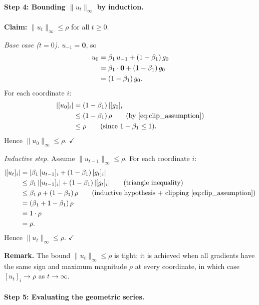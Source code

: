 \documentclass{article}
\begin{document}
\paragraph{Step 4: Bounding $\|u_t\|_\infty$ by induction.}

\noindent\textbf{Claim:} $\|u_t\|_\infty \leq \rho$ for all $t \geq 0$.

\emph{Base case ($t = 0$).}
$u_{-1} = \mathbf{0}$, so
\begin{align}
u_0
&= \beta_1\,u_{-1} + (1-\beta_1)\,g_0 \notag \\
&= \beta_1 \cdot \mathbf{0} + (1-\beta_1)\,g_0 \notag \\
&= (1-\beta_1)\,g_0.
\label{eq:drift_u0}
\end{align}
For each coordinate $i$:
\begin{align}
|[u_0]_i|
&= (1-\beta_1)\,|[g_0]_i| \notag \\
&\leq (1-\beta_1)\,\rho
\qquad\text{(by~\eqref{eq:clip_assumption})} \notag \\
&\leq \rho
\qquad\text{(since $1 - \beta_1 \leq 1$)}.
\label{eq:drift_u0_bound}
\end{align}
Hence $\|u_0\|_\infty \leq \rho$. $\checkmark$

\emph{Inductive step.}
Assume $\|u_{t-1}\|_\infty \leq \rho$. For each coordinate $i$:
\begin{align}
|[u_t]_i|
&= |\beta_1\,[u_{t-1}]_i + (1-\beta_1)\,[g_t]_i|
\notag \\
&\leq \beta_1\,|[u_{t-1}]_i| + (1-\beta_1)\,|[g_t]_i|
\qquad\text{(triangle inequality)}
\notag \\
&\leq \beta_1\,\rho + (1-\beta_1)\,\rho
\qquad\text{(inductive hypothesis $+$ clipping~\eqref{eq:clip_assumption})}
\notag \\
&= (\beta_1 + 1 - \beta_1)\,\rho
\notag \\
&= 1 \cdot \rho
\notag \\
&= \rho.
\label{eq:drift_u_induction}
\end{align}
Hence $\|u_t\|_\infty \leq \rho$. $\checkmark$

\noindent\textbf{Remark.} The bound $\|u_t\|_\infty \leq \rho$ is tight:
it is achieved when all gradients have the same sign and maximum magnitude
$\rho$ at every coordinate, in which case $[u_t]_i \to \rho$ as $t \to \infty$.

\paragraph{Step 5: Evaluating the geometric series.}
\end{document}
